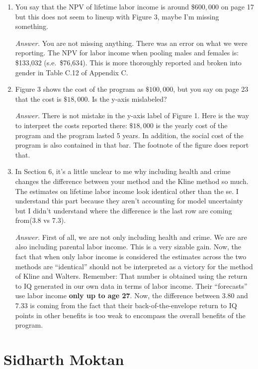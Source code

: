 \begin{enumerate}
\item You say that the NPV of lifetime labor income is around $\$600,000$ on page 17 but this does not seem to lineup with Figure 3, maybe I'm missing something.

\noindent \textit{Answer.} You are not missing anything. There was an error on what we were reporting. The NPV for labor income when pooling males and females is: \$133,032 (s.e.\ \$76,634). This is more thoroughly reported and broken into gender in Table C.12 of Appendix C.

\item Figure 3 shows the cost of the program as $\$100,000$, but you say on page 23 that the cost is $\$18,000$. Is the y-axis mislabeled?

\noindent \textit{Answer.} There is not mistake in the y-axis label of Figure 1. Here is the way to interpret the costs reported there: $\$18,000$ is the yearly cost of the program and the program lasted 5 years. In addition, the social cost of the program is also contained in that bar. The footnote of the figure does report that.

\item In Section 6, it's a little unclear to me why including health and crime changes the difference between your method and the Kline method so much.  The estimates on lifetime labor income look identical other than the se.  I understand this part because they aren't accounting for model uncertainty but I didn't understand where the difference is the last row are coming from(3.8 vs 7.3).

\noindent \textit{Answer.} First of all, we are not only including health and crime. We are are also including parental labor income. This is a very sizable gain. Now, the fact that when only labor income is considered the estimates across the two methods are ``identical'' should not be interpreted as a victory for the method of Kline and Walters. Remember: That number is obtained using the return to IQ generated in our own data in terms of labor income. Their ``forecasts'' use labor income \textbf{only up to age 27}. Now, the difference between $3.80$ and $7.33$ is coming from the fact that their back-of-the-envelope return to IQ points in other benefits is too weak to encompass the overall benefits of the program.
\end{enumerate}

\section{Sidharth Moktan}

